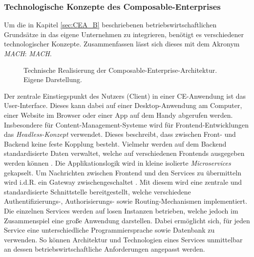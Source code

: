 \subsubsection{Technologische Konzepte des Composable-Enterprises}
Um die in Kapitel \ref{sec:CEA_B} beschriebenen betriebswirtschaftlichen Grundsätze in das eigene Unternehmen zu integrieren, benötigt es verschiedener technologischer Konzepte. Zusammenfassen lässt sich dieses mit dem Akronym \textit{MACH}: \textit{\acl{MACH}}.
\begin{center}
	\begin{figure}[H]
		\centering
		\caption[Technische Realisierung der Composable-Enterprise-Architektur]{Technische Realisierung der Composable-Enterprise-Architektur. Eigene Darstellung.}
		\label{fig:CEA_K}
	\end{figure}	
\end{center}
\vspace*{-15mm}
Der zentrale Einstiegspunkt des Nutzers (Client) in einer CE-Anwendung ist das User-Interface. Dieses kann dabei auf einer Desktop-Anwendung am Computer, einer Website im Browser oder einer App auf dem Handy abgerufen werden. Insbesondere für Content-Management-Systeme wird für Frontend-Entwicklungen das \textit{Headless-Konzept} verwendet. Dieses beschreibt, dass zwischen Front- und Backend keine feste Kopplung besteht. Vielmehr werden auf dem Backend standardisierte Daten verwaltet, welche auf verschiedenen Frontends ausgegeben werden können \cite{.20230313}. Die Applikationslogik wird in kleine isolierte \textit{Microservices} gekapselt. Um Nachrichten zwischen Frontend und den Services zu übermitteln wird i.d.R. ein Gateway zwischengeschaltet \cite[41]{.2009}. Mit diesem wird eine zentrale und standardisierte Schnittstelle bereitgestellt, welche verschiedene Authentifizierungs-, Authorisierungs- sowie Routing-Mechanismen implementiert. Die einzelnen Services werden auf losen Instanzen betrieben, welche jedoch im Zusammenspiel eine große Anwendung darstellen. Dabei ermöglicht sich, für jeden Service eine unterschiedliche Programmiersprache sowie Datenbank zu verwenden. So können Architektur und Technologien eines Services unmittelbar an dessen betriebswirtschaftliche Anforderungen angepasst werden.
